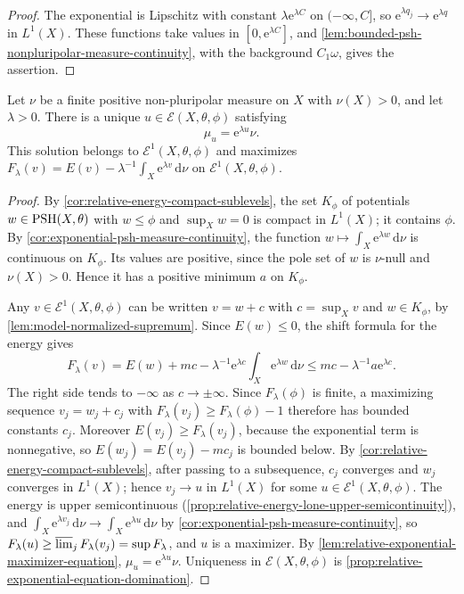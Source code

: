 \begin{proof}
The exponential is Lipschitz with constant $\lambda\mathrm e^{\lambda C}$ on $(-\infty,C]$, so $\mathrm e^{\lambda q_j}\to\mathrm e^{\lambda q}$ in $L^1(X)$. These functions take values in $[0,\mathrm e^{\lambda C}]$, and \cref{lem:bounded-psh-nonpluripolar-measure-continuity}, with the background $C_1\omega$, gives the assertion.
\end{proof}

\begin{theorem}\label{thm:nonpluripolar-relative-exponential-equation}
Let $\nu$ be a finite positive non-pluripolar measure on $X$ with $\nu(X)>0$, and let $\lambda>0$. There is a unique $u\in\mathcal E(X,\theta,\phi)$ satisfying
\[
 \mu_u=\mathrm e^{\lambda u}\nu.
\]
This solution belongs to $\mathcal E^1(X,\theta,\phi)$ and maximizes $F_\lambda(v)=E(v)-\lambda^{-1}\int_X\mathrm e^{\lambda v}\,\mathrm d\nu$ on $\mathcal E^1(X,\theta,\phi)$.
\end{theorem}
\begin{proof}
By \cref{cor:relative-energy-compact-sublevels}, the set $K_\phi$ of potentials $w\in\mathrm{PSH}(X,\theta)$ with $w\leq\phi$ and $\sup_Xw=0$ is compact in $L^1(X)$; it contains $\phi$. By \cref{cor:exponential-psh-measure-continuity}, the function $w\mapsto\int_X\mathrm e^{\lambda w}\,\mathrm d\nu$ is continuous on $K_\phi$. Its values are positive, since the pole set of $w$ is $\nu$-null and $\nu(X)>0$. Hence it has a positive minimum $a$ on $K_\phi$.

Any $v\in\mathcal E^1(X,\theta,\phi)$ can be written $v=w+c$ with $c=\sup_Xv$ and $w\in K_\phi$, by \cref{lem:model-normalized-supremum}. Since $E(w)\leq0$, the shift formula for the energy gives
\[
 F_\lambda(v)=E(w)+mc-\lambda^{-1}\mathrm e^{\lambda c}\int_X\mathrm e^{\lambda w}\,\mathrm d\nu\leq mc-\lambda^{-1}a\mathrm e^{\lambda c}.
\]
The right side tends to $-\infty$ as $c\to\pm\infty$. Since $F_\lambda(\phi)$ is finite, a maximizing sequence $v_j=w_j+c_j$ with $F_\lambda(v_j)\geq F_\lambda(\phi)-1$ therefore has bounded constants $c_j$. Moreover $E(v_j)\geq F_\lambda(v_j)$, because the exponential term is nonnegative, so $E(w_j)=E(v_j)-mc_j$ is bounded below. By \cref{cor:relative-energy-compact-sublevels}, after passing to a subsequence, $c_j$ converges and $w_j$ converges in $L^1(X)$; hence $v_j\to u$ in $L^1(X)$ for some $u\in\mathcal E^1(X,\theta,\phi)$. The energy is upper semicontinuous (\cref{prop:relative-energy-lone-upper-semicontinuity}), and $\int_X\mathrm e^{\lambda v_j}\,\mathrm d\nu\to\int_X\mathrm e^{\lambda u}\,\mathrm d\nu$ by \cref{cor:exponential-psh-measure-continuity}, so $F_\lambda(u)\geq\varlimsup_jF_\lambda(v_j)=\sup F_\lambda$, and $u$ is a maximizer. By \cref{lem:relative-exponential-maximizer-equation}, $\mu_u=\mathrm e^{\lambda u}\nu$. Uniqueness in $\mathcal E(X,\theta,\phi)$ is \cref{prop:relative-exponential-equation-domination}.
\end{proof}

